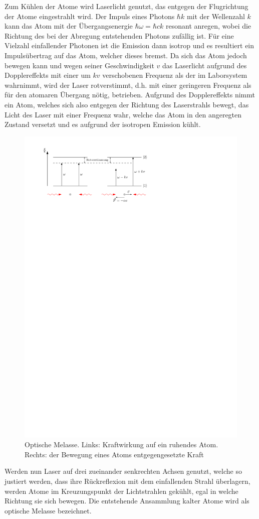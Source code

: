\documentclass[11pt, a4paper]{article}
\numberwithin{equation}{section}
\begin{document}
Zum Kühlen der Atome wird Laserlicht genutzt, das entgegen der Flugrichtung der Atome eingestrahlt wird.
Der Impuls eines Photons $\hbar k$ mit der Wellenzahl $k$ kann das Atom mit der Übergangsenergie $\hbar\omega = \hbar c k$ resonant anregen, wobei die Richtung des bei der Abregung entstehenden Photons zufällig ist.
Für eine Vielzahl einfallender Photonen ist die Emission dann isotrop und es resultiert ein Impulsübertrag auf das Atom, welcher dieses bremst.
Da sich das Atom jedoch bewegen kann und wegen seiner Geschwindigkeit $v$ das Laserlicht aufgrund des Dopplereffekts mit einer um $kv$ verschobenen Frequenz als der im Laborsystem wahrnimmt, wird der Laser rotverstimmt, d.h. mit einer geringeren Frequenz als für den atomaren Übergang nötig, betrieben.
Aufgrund des Dopplereffekts nimmt ein Atom, welches sich also entgegen der Richtung des Laserstrahls bewegt, das Licht des Laser mit einer Frequenz wahr, welche das Atom in den angeregten Zustand versetzt und es aufgrund der isotropen Emission kühlt.
\begin{figure}[h]
	\centering
	\includegraphics[width=.8\textwidth]{./figures/theory/melasse}
	\caption{Optische Melasse. Links: Kraftwirkung auf ein ruhendes Atom. Rechts: der Bewegung eines Atoms entgegengesetzte Kraft}
\end{figure}
Werden nun Laser auf drei zueinander senkrechten Achsen genutzt, welche so justiert werden, dass ihre Rückreflexion mit dem einfallenden Strahl überlagern, werden Atome im Kreuzungspunkt der Lichtstrahlen gekühlt, egal in welche Richtung sie sich bewegen.
Die entstehende Ansammlung kalter Atome wird als optische Melasse bezeichnet.
\end{document}
